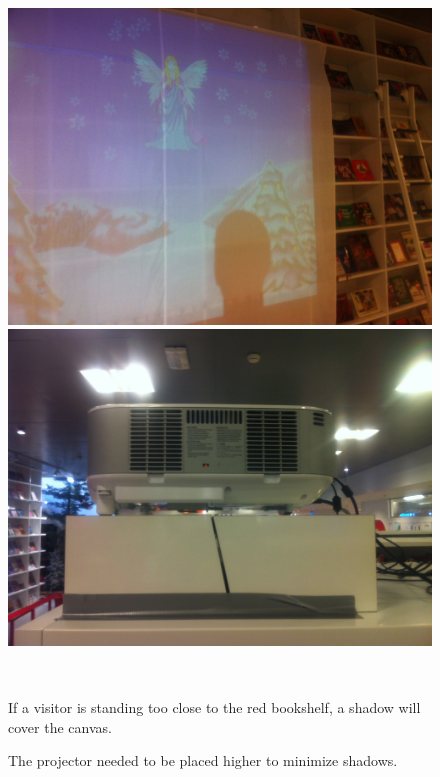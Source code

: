 \begin{figure}[htbp] \centering
\begin{minipage}[b]{0.45\textwidth} \centering
\includegraphics[width=1.00\textwidth]{Pictures/Design/shadow} %
\end{minipage} \hfill
\begin{minipage}[b]{0.45\textwidth} \centering
\includegraphics[width=1.00\textwidth]{Pictures/Design/projector_box} %
\end{minipage} \\ %
\begin{minipage}[t]{0.45\textwidth}
\caption{If a visitor is standing too close to the red bookshelf, a shadow will cover the canvas.} %
\label{fig:shadow_canvas}
\end{minipage} \hfill
\begin{minipage}[t]{0.45\textwidth}
\caption{The projector needed to be placed higher to minimize shadows.} %
\label{fig:projector_box}
\end{minipage}
\end{figure}

